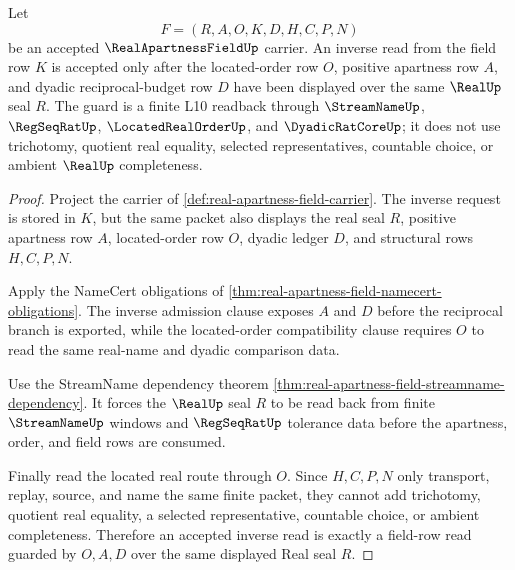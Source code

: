 \begin{theorem}
\label{thm:real-apartness-field-located-order-inverse-guard}
Let
$$
F=(R,A,O,K,D,H,C,P,N)
$$
be an accepted $\RealApartnessFieldUp$ carrier. An inverse read from the field row $K$ is accepted only after the located-order row $O$, positive apartness row $A$, and dyadic reciprocal-budget row $D$ have been displayed over the same $\RealUp$ seal $R$. The guard is a finite L10 readback through $\StreamNameUp$, $\RegSeqRatUp$, $\LocatedRealOrderUp$, and $\DyadicRatCoreUp$; it does not use trichotomy, quotient real equality, selected representatives, countable choice, or ambient $\RealUp$ completeness.
\end{theorem}
\begin{proof}
Project the carrier of \autoref{def:real-apartness-field-carrier}. The inverse request is stored in $K$, but the same packet also displays the real seal $R$, positive apartness row $A$, located-order row $O$, dyadic ledger $D$, and structural rows $H,C,P,N$.

Apply the NameCert obligations of \autoref{thm:real-apartness-field-namecert-obligations}. The inverse admission clause exposes $A$ and $D$ before the reciprocal branch is exported, while the located-order compatibility clause requires $O$ to read the same real-name and dyadic comparison data.

Use the StreamName dependency theorem \autoref{thm:real-apartness-field-streamname-dependency}. It forces the $\RealUp$ seal $R$ to be read back from finite $\StreamNameUp$ windows and $\RegSeqRatUp$ tolerance data before the apartness, order, and field rows are consumed.

Finally read the located real route through $O$. Since $H,C,P,N$ only transport, replay, source, and name the same finite packet, they cannot add trichotomy, quotient real equality, a selected representative, countable choice, or ambient completeness. Therefore an accepted inverse read is exactly a field-row read guarded by $O,A,D$ over the same displayed Real seal $R$.
\end{proof}


